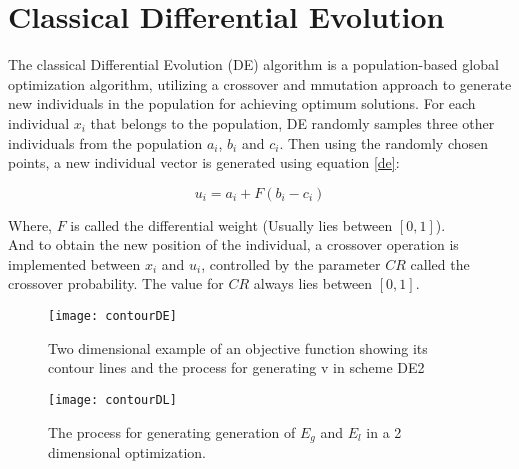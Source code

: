 
\section{Classical Differential Evolution}

The classical Differential Evolution (DE) algorithm is a population-based global optimization algorithm, utilizing a crossover and mmutation approach to generate new individuals in the population for achieving optimum solutions. For each individual $x_i$ that belongs to the population, DE randomly samples three other individuals from the population $a_i$, $b_i$ and $c_i$. Then using the randomly chosen points, a new individual vector is generated using equation \eqref{de}:

\begin{equation}
\label{de}
u_i = a_i + F (b_i - c_i)
\end{equation}

Where, $F$ is called the differential weight (Usually lies between $[0, 1]$).\\
And to obtain the new position of the individual, a crossover operation is implemented between $x_i$ and $u_i$, controlled by the parameter $CR$ called the crossover probability. The value for $CR$ always lies between $[0, 1]$.

\begin{figure}[h!]
  \texttt{[image: contourDE]}
  \caption{Two dimensional example of an objective function showing its contour lines and the process for
generating v in scheme DE2}
  \label{fig:contourDE}
\end{figure}

\begin{figure}[h!]
  \texttt{[image: contourDL]}
  \caption{The process for generating generation of $E_g$ and $E_l$ in a 2 dimensional optimization.}
  \label{fig:contourDL}
\end{figure}

